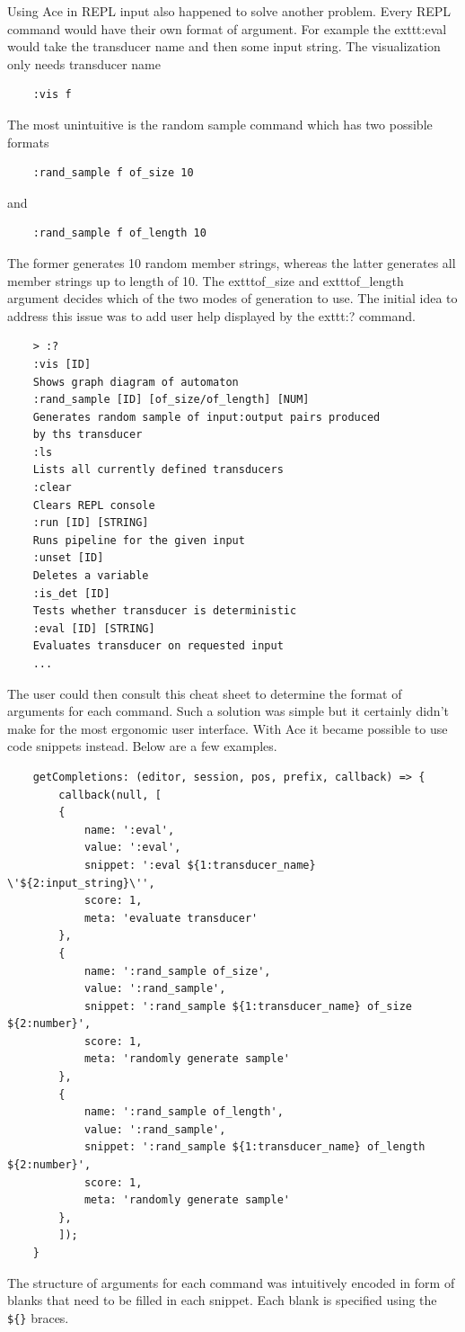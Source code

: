 Using Ace in REPL input also happened to solve another problem. Every REPL command would have their own format of argument. For example the     exttt{:eval} would take the transducer name and then some input string. The visualization only needs transducer name
\begin{lstlisting}
	:vis f
\end{lstlisting}
The most unintuitive is the random sample command which has two possible formats
\begin{lstlisting}
	:rand_sample f of_size 10
\end{lstlisting}
and
\begin{lstlisting}
	:rand_sample f of_length 10
\end{lstlisting}
The former generates 10 random member strings, whereas the latter generates all member strings up to length of 10.
The     exttt{of\_size} and     exttt{of\_length} argument decides which of the two modes of generation to use. The initial idea to address this issue was to add user help displayed by the     exttt{:?} command.
\begin{lstlisting}
	> :?
	:vis [ID]
	Shows graph diagram of automaton
	:rand_sample [ID] [of_size/of_length] [NUM]
	Generates random sample of input:output pairs produced 
	by ths transducer
	:ls
	Lists all currently defined transducers
	:clear
	Clears REPL console
	:run [ID] [STRING]
	Runs pipeline for the given input
	:unset [ID]
	Deletes a variable
	:is_det [ID]
	Tests whether transducer is deterministic
	:eval [ID] [STRING]
	Evaluates transducer on requested input
	...
\end{lstlisting}
The user could then consult this cheat sheet to determine the format of arguments for each command. Such a solution was simple but it certainly didn't make for the most ergonomic user interface. With Ace it became possible to use code snippets instead.
Below are a few examples.
\begin{lstlisting}
	getCompletions: (editor, session, pos, prefix, callback) => {
		callback(null, [
		{
			name: ':eval',
			value: ':eval',
			snippet: ':eval ${1:transducer_name} \'${2:input_string}\'',
			score: 1,
			meta: 'evaluate transducer'
		},
		{
			name: ':rand_sample of_size',
			value: ':rand_sample',
			snippet: ':rand_sample ${1:transducer_name} of_size ${2:number}',
			score: 1,
			meta: 'randomly generate sample'
		},
		{
			name: ':rand_sample of_length',
			value: ':rand_sample',
			snippet: ':rand_sample ${1:transducer_name} of_length ${2:number}',
			score: 1,
			meta: 'randomly generate sample'
		},
		]);
	}
\end{lstlisting}
The structure of arguments for each command was intuitively encoded in form
of blanks that need to be filled in each snippet. Each blank is specified using the \texttt{\$\{\}} braces.

